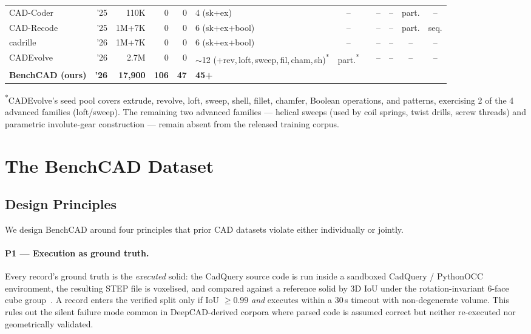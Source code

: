 \documentclass{article}
\newcommand{\cmark}{\ding{51}}
\begin{document}
\begin{table}[t]
\begin{tabular}{lrrrrlcccccc}
CAD-Coder~\citep{Guan2025}          & '25 & 110K   & 0    & 0   & 4 (sk+ex)                       & --     & \cmark & --     & --     & part.  & --     \\
CAD-Recode~\citep{Rukhovich2025}    & '25 & 1M+7K  & 0    & 0   & 6 (sk+ex+bool)                  & --     & \cmark & --     & --     & part.  & seq.   \\
cadrille~\citep{Kolodiazhnyi2026}   & '26 & 1M+7K  & 0    & 0   & 6 (sk+ex+bool)                  & --     & \cmark & --     & --     & --     & --     \\
CADEvolve~\citep{Elistratov2026}    & '26 & 2.7M   & 0    & 0   & $\sim$12 (+rev,\,loft,\,sweep,\,fil,\,cham,\,sh)\textsuperscript{*} & part.\textsuperscript{*} & \cmark & --     & --     & --     & --     \\
\midrule
\textbf{BenchCAD (ours)} & \textbf{'26} & \textbf{17{,}900} & \textbf{106} & \textbf{47} & \textbf{45+} & \textbf{\cmark} & \textbf{\cmark} & \textbf{\cmark} & \textbf{\cmark} & \textbf{\cmark} & \textbf{\cmark} \\
\bottomrule
\end{tabular}

\vspace{2pt}
{\footnotesize\textsuperscript{*}CADEvolve's seed pool covers extrude, revolve, loft, sweep, shell, fillet, chamfer, Boolean operations, and patterns, exercising 2 of the 4 advanced families (loft/sweep). The remaining two advanced families --- helical sweeps (used by coil springs, twist drills, screw threads) and parametric involute-gear construction --- remain absent from the released training corpus.}
\end{table}


\section{The BenchCAD Dataset}
\label{sec:dataset}

\subsection{Design Principles}
We design BenchCAD around four principles that prior CAD datasets violate either individually or jointly.

\paragraph{P1 --- Execution as ground truth.} Every record's ground truth is the \emph{executed} solid: the CadQuery source code is run inside a sandboxed CadQuery / PythonOCC environment, the resulting STEP file is voxelised, and compared against a reference solid by 3D IoU under the rotation-invariant 6-face cube group~\citep{rot_iou}. A record enters the verified split only if IoU $\geq 0.99$ \emph{and} executes within a 30\,s timeout with non-degenerate volume. This rules out the silent failure mode common in DeepCAD-derived corpora where parsed code is assumed correct but neither re-executed nor geometrically validated.
\end{document}
